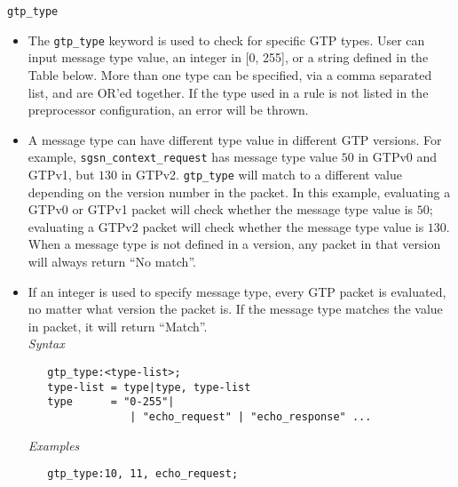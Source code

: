 \documentclass[english]{report}
\begin{document}
\texttt{gtp\_type}
\label{gtp:gtp_method}
\begin{itemize}
 \item[] The \texttt{gtp\_type} keyword is used to check for specific GTP types.
  User can input message type value, an integer in [0, 255], or a string defined
  in the Table below. More than one type can be specified, via a comma separated
  list, and are OR'ed together. If the type used in a rule is not listed in the 
  preprocessor configuration, an error will be thrown. 

 \item[] A message type can have different type value in different GTP 
  versions. For example, \texttt{sgsn\_\-context\_\-request} has message type 
  value $50$ in GTPv0 and GTPv1, but $130$ in GTPv2. \texttt{gtp\_type} will 
  match to a different value depending on the version number in the packet. 
  In this example, evaluating a GTPv0 or GTPv1 packet will check whether the 
  message type value is $50$; evaluating a GTPv2 packet will check whether the 
  message type value is $130$. When a message type is not defined in a version,
  any packet in that version will always return ``No match''. 
  
 \item[] If an integer is used to specify message type, every GTP packet is 
  evaluated, no matter what version the packet is. If the message type matches
  the value in packet, it will return ``Match''. \\

\textit{Syntax}
\footnotesize
\begin{verbatim}
   gtp_type:<type-list>;
   type-list = type|type, type-list
   type      = "0-255"|
                | "echo_request" | "echo_response" ...
\end{verbatim}
\normalsize
\textit{Examples}
\footnotesize
\begin{verbatim}
   gtp_type:10, 11, echo_request;
\end{verbatim}
\normalsize


\end{itemize}
\end{document}
